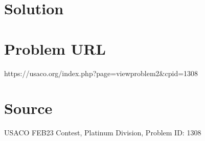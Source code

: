 \documentclass[12pt]{article}
\begin{document}
\section*{Solution}


\section*{Problem URL}
https://usaco.org/index.php?page=viewproblem2&cpid=1308

\section*{Source}
USACO FEB23 Contest, Platinum Division, Problem ID: 1308
\end{document}
